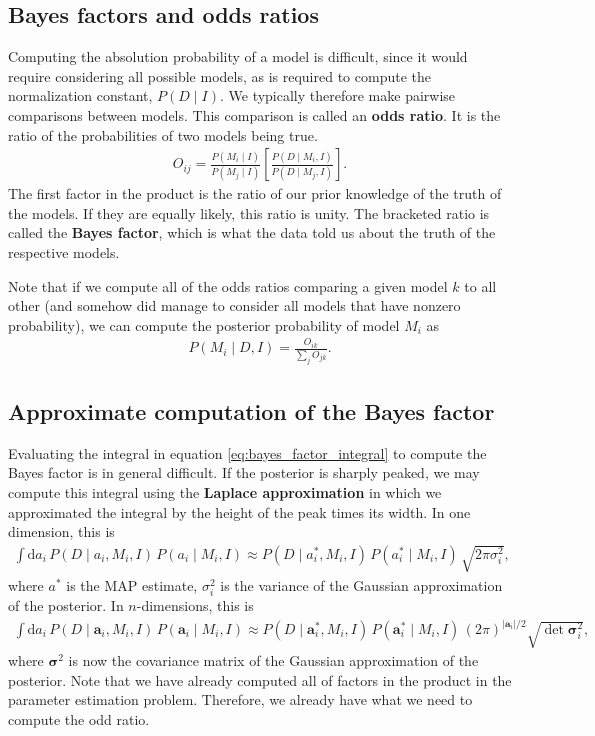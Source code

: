 \subsection{Bayes factors and odds ratios}
Computing the absolution probability of a model is difficult, since it
would require considering all possible models, as is required to
compute the normalization constant, $P(D\mid I)$.  We typically
therefore make pairwise comparisons between models.  This comparison
is called an \textbf{odds ratio}.  It is the ratio of the
probabilities of two models being true.
\begin{align}
O_{ij} = \frac{P(M_i\mid I)}{P(M_j\mid I)} 
\left[\frac{P(D\mid M_i, I)}{P(D\mid M_j, I)}\right].
\end{align}
The first factor in the product is the ratio of our prior knowledge of
the truth of the models.  If they are equally likely, this ratio is
unity.  The bracketed ratio is called the \textbf{Bayes factor}, which
is what the data told us about the truth of the respective models.

Note that if we compute all of the odds ratios comparing a given model
$k$ to all other (and somehow did manage to consider all models that
have nonzero probability), we can compute the posterior probability of
model $M_i$ as
\begin{align}
P(M_i\mid D, I) = \frac{O_{ik}}{\sum_j O_{jk}}.
\end{align}


\subsection{Approximate computation of the Bayes factor}
Evaluating the integral in equation \eqref{eq:bayes_factor_integral} to
compute the Bayes factor is in general difficult.  If the posterior is
sharply peaked, we may compute this integral using the
\textbf{Laplace approximation} in which we approximated the integral
by the height of the peak times its width.  In one dimension, this is
\begin{align}
\int \mathrm{d}a_i\,P(D\mid a_i, M_i, I)\,P(a_i\mid M_i, I)
\approx P(D\mid a_i^*, M_i, I)\,P(a_i^*\mid M_i, I)\,\sqrt{2\pi\sigma_i^2},
\end{align}
where $a^*$ is the MAP estimate, $\sigma_i^2$ is the variance of the
Gaussian approximation of the posterior.  In $n$-dimensions, this is
\begin{align}
\int \mathrm{d}a_i\,P(D\mid \mathbf{a}_i, M_i, I)\,P(\mathbf{a}_i\mid M_i, I)
\approx P(D\mid \mathbf{a}_i^*, M_i, I)\,P(\mathbf{a}_i^*\mid M_i, I)\,\left(2\pi\right)^{|\mathbf{a}_i|/2}\sqrt{\det\boldsymbol{\sigma}_i^2},
\end{align}
where $\boldsymbol{\sigma}^2$ is now the covariance matrix of the
Gaussian approximation of the posterior.  Note that we have already
computed all of factors in the product in the parameter estimation
problem.  Therefore, we already have what we need to compute the odd
ratio.


